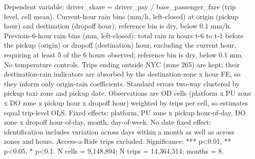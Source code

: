 \par \raggedright 
Dependent variable: driver\_share = driver\_pay / base\_passenger\_fare (trip level, cell mean). Current-hour rain bins (mm/h, left-closed) at origin (pickup hour) and destination (dropoff hour); reference bin is dry, below 0.1 mm/h. Previous-6-hour rain bins (mm, left-closed): total rain in hours t-6 to t-1 before the pickup (origin) or dropoff (destination) hour, excluding the current hour, requiring at least 5 of the 6 hours observed; reference bin is dry, below 0.1 mm. No temperature controls. Trips ending outside NYC (zone 265) are kept; their destination-rain indicators are absorbed by the destination-zone x hour FE, so they inform only origin-rain coefficients. Standard errors two-way clustered by pickup taxi zone and pickup date. Observations are OD cells (platform x PU zone x DO zone x pickup hour x dropoff hour) weighted by trips per cell, so estimates equal trip-level OLS. Fixed effects: platform, PU zone x pickup hour-of-day, DO zone x dropoff hour-of-day, month, day-of-week. No date fixed effect: identification includes variation across days within a month as well as across zones and hours. Access-a-Ride trips excluded. Significance: *** p<0.01, ** p<0.05, * p<0.1. N cells = 9,148,894; N trips = 14,364,514; months = 8.
\par\endgroup


\ifdefined\ifclassloaded
{}
\fi
